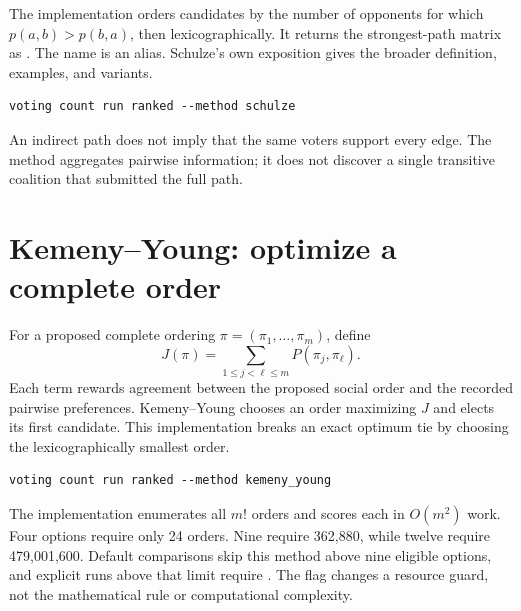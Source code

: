 The implementation orders candidates by the number of opponents for which $p(a,b)>p(b,a)$, then lexicographically. It returns the strongest-path matrix as . The name  is an alias. Schulze's own exposition gives the broader definition, examples, and variants.\cite{schulze}
\begin{lstlisting}[style=votingrun]
voting count run ranked --method schulze
\end{lstlisting}
An indirect path does not imply that the same voters support every edge. The method aggregates pairwise information; it does not discover a single transitive coalition that submitted the full path.

\section{Kemeny--Young: optimize a complete order}
For a proposed complete ordering $\pi=(\pi_1,\ldots,\pi_m)$, define
\[
J(\pi)=\sum_{1\leq j<\ell\leq m}P(\pi_j,\pi_\ell).
\]
Each term rewards agreement between the proposed social order and the recorded pairwise preferences. Kemeny--Young chooses an order maximizing $J$ and elects its first candidate. This implementation breaks an exact optimum tie by choosing the lexicographically smallest order.
\begin{lstlisting}[style=votingrun]
voting count run ranked --method kemeny_young
\end{lstlisting}
The implementation enumerates all $m!$ orders and scores each in $O(m^2)$ work. Four options require only 24 orders. Nine require 362,880, while twelve require 479,001,600. Default comparisons skip this method above nine eligible options, and explicit runs above that limit require . The flag changes a resource guard, not the mathematical rule or computational complexity.

